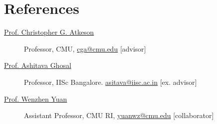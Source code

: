 \documentclass[letterpaper,11pt]{article}
\begin{document}
\section{References}
\begin{description}
  \item[\href{https://www.cs.cmu.edu/~cga/}{Prof. Christopher G. Atkeson }] Professor, CMU, \href{mailto:cga@cmu.edu}{cga@cmu.edu} [advisor]
  \vspace{-0.1 in}
  \item[\href{https://mecheng.iisc.ac.in/~asitava/}{Prof. Ashitava Ghosal}] Professor, IISc Bangalore.  \href{mailto:asitava@iisc.ac.in}{asitava@iisc.ac.in} [ex. advisor]
  \vspace{-0.1 in}
  \item[\href{http://robotouch.ri.cmu.edu/yuanwz/}{Prof. Wenzhen Yuan}] Assistant Professor, CMU RI, \href{mailto:yuanwz@cmu.edu}{yuanwz@cmu.edu} [collaborator]
  \end{description}
  
\end{document}
